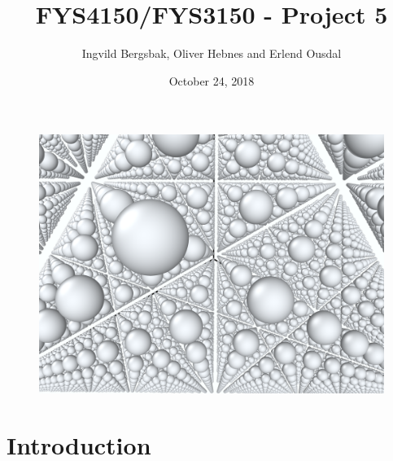 \documentclass{article}
\begin{document}
\title{\textbf{FYS4150/FYS3150 - Project 5}}
\author{Ingvild Bergsbak, Oliver Hebnes and Erlend Ousdal}
\date{October 24, 2018}


\maketitle
\begin{figure}[H]
  \includegraphics[scale=0.25]{plots/fcc_lattice_frontpage.png}
  \label{}
  \centering
\end{figure}

\newpage
\begin{abstract}
\end{abstract}
\section{Introduction}
\end{document}
